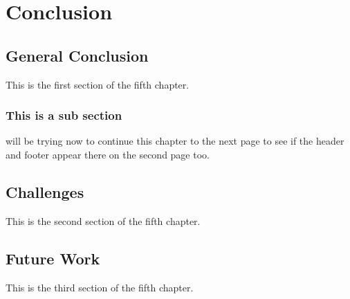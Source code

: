 \chapter{Conclusion} \label{Conclusion}
\section{General Conclusion} \label{General Conclusion}
This is the first section of the fifth chapter.

\subsection{This is a sub section} \label{This is a sub section}
will be trying now to continue this chapter to the next page to see if the header and footer appear there on the second page too.
\section{Challenges} \label{Challenges}
This is the second section of the fifth chapter.
\section{Future Work} \label{Future Work}
This is the third section of the fifth chapter.




